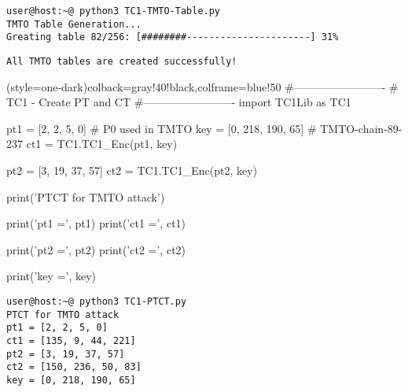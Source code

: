\begin{lstlisting}[style=terminal]
user@host:~@ python3 TC1-TMTO-Table.py
TMTO Table Generation...
Greating table 82/256: [########----------------------] 31% 
\end{lstlisting}
\begin{lstlisting}[style=terminal]
All TMTO tables are created successfully!
\end{lstlisting}

\newpage
\begin{python}[TC1-PTCT.py](style=one-dark){colback=gray!40!black,colframe=blue!50}
#-------------------------
# TC1 - Create PT and CT
#-------------------------
import TC1Lib as TC1

pt1 = [2, 2, 5, 0]  # P0 used in TMTO
key = [0, 218, 190, 65]  # TMTO-chain-89-237
ct1 = TC1.TC1_Enc(pt1, key)

pt2 = [3, 19, 37, 57]
ct2 = TC1.TC1_Enc(pt2, key)

print('PTCT for TMTO attack')

print('pt1 =', pt1)
print('ct1 =', ct1)

print('pt2 =', pt2)
print('ct2 =', ct2)

print('key =', key)
\end{python}

\begin{lstlisting}[style=terminal]
user@host:~@ python3 TC1-PTCT.py      
PTCT for TMTO attack
pt1 = [2, 2, 5, 0]
ct1 = [135, 9, 44, 221]
pt2 = [3, 19, 37, 57]
ct2 = [150, 236, 50, 83]
key = [0, 218, 190, 65]
\end{lstlisting}

